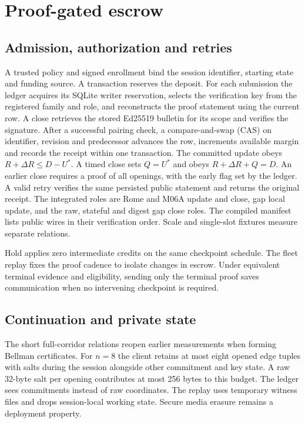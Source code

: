\section{Proof-gated escrow}
\label{sec:protocol}

\subsection{Admission, authorization and retries}
A trusted policy and signed enrollment bind the session identifier, starting state and funding source. A transaction reserves the deposit. For each submission the ledger acquires its SQLite writer reservation, selects the verification key from the registered family and role, and reconstructs the proof statement using the current row. A close retrieves the stored Ed25519 bulletin for its scope and verifies the signature. After a successful pairing check, a compare-and-swap (CAS) on identifier, revision and predecessor advances the row, increments available margin and records the receipt within one transaction. The committed update obeys $R+\Delta R\le D-U^*$. A timed close sets $Q=U^*$ and obeys $R+\Delta R+Q=D$. An earlier close requires a proof of all openings, with the early flag set by the ledger. A valid retry verifies the same persisted public statement and returns the original receipt. The integrated roles are Rome and M06A update and close, gap local update, and the raw, stateful and digest gap close roles. The compiled manifest lists public wires in their verification order. Scale and single-slot fixtures measure separate relations.

Hold applies zero intermediate credits on the same checkpoint schedule. The fleet replay fixes the proof cadence to isolate changes in escrow. Under equivalent terminal evidence and eligibility, sending only the terminal proof saves communication when no intervening checkpoint is required.

\subsection{Continuation and private state}
The short full-corridor relations reopen earlier measurements when forming Bellman certificates. For $n=8$ the client retains at most eight opened edge tuples with salts during the session alongside other commitment and key state. A raw 32-byte salt per opening contributes at most 256 bytes to this budget. The ledger sees commitments instead of raw coordinates. The replay uses temporary witness files and drops session-local working state. Secure media erasure remains a deployment property.

